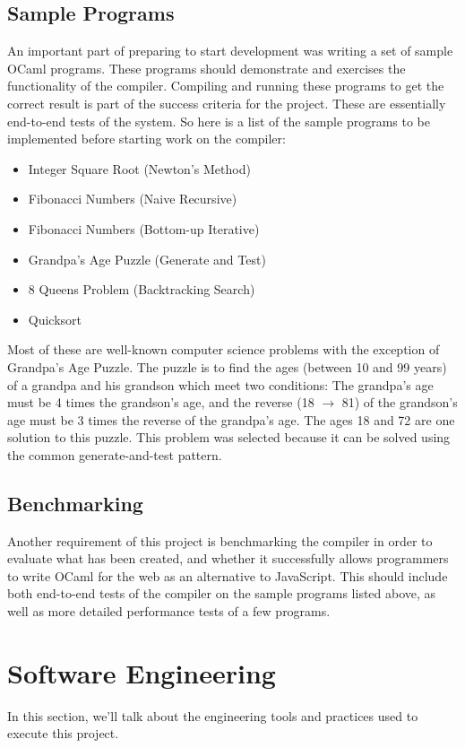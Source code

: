 \documentclass[12pt,a4paper,twoside,openright]{report}
\begin{document}
\subsection{Sample Programs}
An important part of preparing to start development was writing a set of sample OCaml programs.
These programs should demonstrate and exercises the functionality of the compiler.
Compiling and running these programs to get the correct result is part of the success criteria for the project.
These are essentially end-to-end tests of the system.
So here is a list of the sample programs to be implemented before starting work on the compiler:
\begin{itemize}
   \item Integer Square Root (Newton's Method)
   \item Fibonacci Numbers (Naive Recursive)
   \item Fibonacci Numbers (Bottom-up Iterative)
   \item Grandpa's Age Puzzle (Generate and Test)
   \item 8 Queens Problem (Backtracking Search)
   \item Quicksort
\end{itemize}
Most of these are well-known computer science problems with the exception of Grandpa's Age Puzzle.
The puzzle is to find the ages (between 10 and 99 years) of a grandpa and his grandson which meet two conditions: The grandpa's age must be 4 times the grandson's age, and the reverse (18 $\rightarrow$ 81) of the grandson's age must be 3 times the reverse of the grandpa's age.
The ages 18 and 72 are one solution to this puzzle.
This problem was selected because it can be solved using the common generate-and-test pattern.

\subsection{Benchmarking}
Another requirement of this project is benchmarking the compiler in order to evaluate what has been created, and whether it successfully allows programmers to write OCaml for the web as an alternative to JavaScript.
This should include both end-to-end tests of the compiler on the sample programs listed above, as well as more detailed performance tests of a few programs.

\section{Software Engineering}
In this section, we'll talk about the engineering tools and practices used to execute this project.
\end{document}
